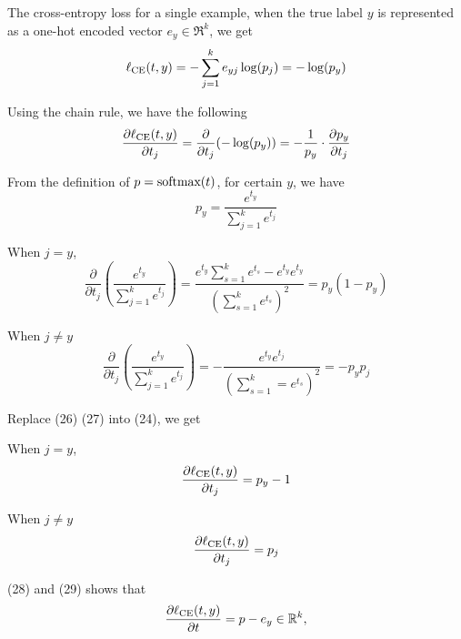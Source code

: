 \begin{answer}

The cross-entropy loss for a single example, when the true label $y$
 is represented as a one-hot encoded vector $e_y\in \Re^k$, we get 
\begin{equation}
    \ell_{\textup{CE}}(t, y) = -\sum_{j=1}^{k} e_{yj} \log(p_j) = - \log(p_y)
\end{equation}

Using the chain rule, we have the following
\begin{equation}
    \frac{\partial \ell_{\textup{CE}}(t, y)}{\partial t_j} = \frac{\partial}{\partial t_j} (-\log(p_y)) = -\frac{1}{p_y} \cdot \frac{\partial p_y}{\partial t_j}
\end{equation}

From the definition of  $p = \softmax(t)$, for certain $y$, we have 
\begin{equation}
    p_y = \frac{e^{t_y}}{\sum_{j=1}^{k} e^{t_j}} 
\end{equation}

When $j =y$,
\begin{equation}
    \frac{\partial}{\partial t_j} \left( \frac{e^{t_y}}{\sum_{j=1}^{k} e^{t_j}}  \right) = \frac{e^{t_y} \sum_{s=1}^{k} e^{t_s} - e^{t_y} e^{t_y}}{\left(\sum_{s=1}^{k} e^{t_s}\right)^2} = p_y (1 - p_y)
\end{equation}

When $j \neq y$
\begin{equation}
    \frac{\partial}{\partial t_j} \left( \frac{e^{t_y}}{\sum_{j=1}^{k} e^{t_j}}  \right) =- \frac{e^{t_y} e^{t_j}}{\left(\sum_{s=1}^{k}  = e^{t_s}\right)^2} = - p_y p_j
\end{equation}

Replace (26) (27) into (24), we get

When $j =y$,
\begin{equation}
    \frac{\partial \ell_{\textup{CE}}(t, y)}{\partial t_j} = p_y - 1
\end{equation}

When $j \neq y$
\begin{equation}
    \frac{\partial \ell_{\textup{CE}}(t, y)}{\partial t_j} = p_j
\end{equation}

(28) and (29) shows that 
\begin{align}
\frac{\partial \ell_\textup{CE}(t, y)}{\partial t} = p - e_y \in \Re^k,
\end{align}
\end{answer}
   
  
